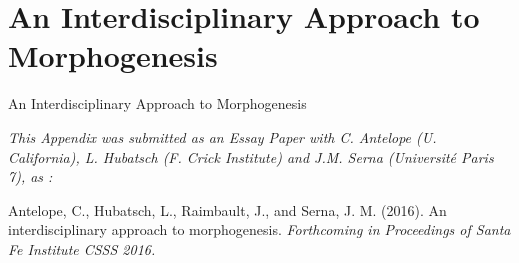 
\chapter{An Interdisciplinary Approach to Morphogenesis}{An Interdisciplinary Approach to Morphogenesis} %

\label{app:syntheticdata} %


\textit{This Appendix was submitted as an Essay Paper with C. Antelope (U. California), L. Hubatsch (F. Crick Institute) and J.M. Serna (Université Paris 7), as : }

\noindent Antelope, C., Hubatsch, L., Raimbault, J., and Serna, J. M. (2016). An interdisciplinary approach to morphogenesis. \textit{Forthcoming in Proceedings of Santa Fe Institute CSSS 2016.}







